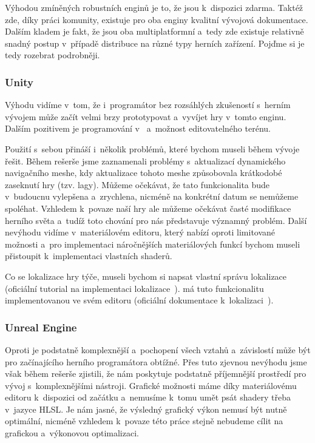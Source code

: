 Výhodou zmíněných robustních enginů je to, že jsou k~dispozici zdarma. Taktéž zde, díky práci komunity, existuje pro oba enginy kvalitní vývojová dokumentace. Dalším kladem je fakt, že jsou oba multiplatformní a~tedy zde existuje relativně snadný postup v~případě distribuce na různé typy herních zařízení. Pojďme si je tedy rozebrat podrobněji.

\subsubsection{Unity}
Výhodu \UN{} vidíme v~tom, že i~programátor bez rozsáhlých zkušeností s~herním vývojem může začít velmi brzy prototypovat a~vyvíjet hry v~tomto enginu. Dalším pozitivem je programování v~\CS{} a~možnost editovatelného terénu.

Použití \UN{} s~sebou přináší i~několik problémů, které bychom museli během vývoje řešit. Během rešerše jsme zaznamenali problémy s~aktualizací dynamického navigačního meshe, kdy aktualizace tohoto meshe způsobovala krátkodobé zaseknutí hry (tzv. lagy). Můžeme očekávat, že tato funkcionalita bude v~budoucnu vylepšena a~zrychlena, nicméně na konkrétní datum se nemůžeme spoléhat. Vzhledem k~povaze naší hry ale můžeme očekávat časté modifikace herního světa a~tudíž toto chování pro nás představuje významný problém. Další nevýhodu vidíme v~materiálovém editoru, který nabízí oproti \UE{} limitované možnosti a~pro implementaci náročnějších materiálových funkcí bychom museli přistoupit k~implementaci vlastních shaderů.

Co se lokalizace hry týče, museli bychom si napsat vlastní správu lokalizace (oficiální tutorial na implementaci lokalizace~\citep{unity_loc}). \UE{} má tuto funkcionalitu implementovanou ve svém editoru (oficiální dokumentace k~lokalizaci~\citep{ue_loc}).


\subsubsection{Unreal Engine}
Oproti \UN{} je \UE{} podstatně komplexnější a~pochopení všech vztahů a~závislostí může být pro začínajícího herního programátora obtížné. Přes tuto zjevnou nevýhodu jsme však během rešerše zjistili, že \UE{} nám poskytuje podstatně příjemnější prostředí pro vývoj s~komplexnějšími nástroji. Grafické možnosti máme díky materiálovému editoru k~dispozici od začátku a~nemusíme k~tomu umět psát shadery třeba v~jazyce HLSL. Je nám jasné, že výsledný grafický výkon nemusí být nutně optimální, nicméně vzhledem k~povaze této práce stejně nebudeme cílit na grafickou a~výkonovou optimalizaci.

